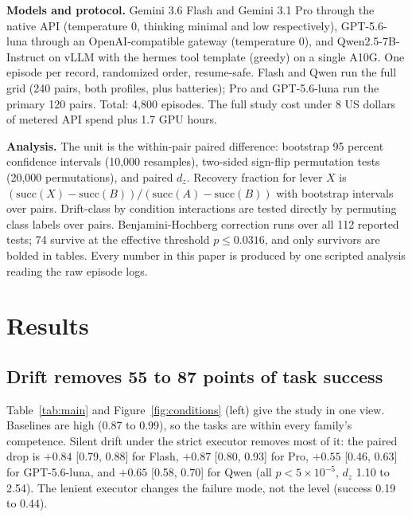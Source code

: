 \textbf{Models and protocol.} Gemini 3.6 Flash and Gemini 3.1 Pro through the native API (temperature 0, thinking minimal and low respectively), GPT-5.6-luna through an OpenAI-compatible gateway (temperature 0), and Qwen2.5-7B-Instruct on vLLM with the hermes tool template (greedy) on a single A10G. One episode per record, randomized order, resume-safe. Flash and Qwen run the full grid (240 pairs, both profiles, plus batteries); Pro and GPT-5.6-luna run the primary 120 pairs. Total: 4,800 episodes. The full study cost under 8 US dollars of metered API spend plus 1.7 GPU hours.

\textbf{Analysis.} The unit is the within-pair paired difference: bootstrap 95 percent confidence intervals (10,000 resamples), two-sided sign-flip permutation tests (20,000 permutations), and paired $d_z$. Recovery fraction for lever $X$ is $(\mathrm{succ}(X) - \mathrm{succ}(B))/(\mathrm{succ}(A) - \mathrm{succ}(B))$ with bootstrap intervals over pairs. Drift-class by condition interactions are tested directly by permuting class labels over pairs. Benjamini-Hochberg correction runs over all 112 reported tests; 74 survive at the effective threshold $p \le 0.0316$, and only survivors are bolded in tables. Every number in this paper is produced by one scripted analysis reading the raw episode logs.

\section{Results}

\subsection{Drift removes 55 to 87 points of task success}
\label{sec:results-drop}

Table~\ref{tab:main} and Figure~\ref{fig:conditions} (left) give the study in one view. Baselines are high (0.87 to 0.99), so the tasks are within every family's competence. Silent drift under the strict executor removes most of it: the paired drop is $+0.84$ [0.79, 0.88] for Flash, $+0.87$ [0.80, 0.93] for Pro, $+0.55$ [0.46, 0.63] for GPT-5.6-luna, and $+0.65$ [0.58, 0.70] for Qwen (all $p < 5\times10^{-5}$, $d_z$ 1.10 to 2.54). The lenient executor changes the failure mode, not the level (success 0.19 to 0.44).

